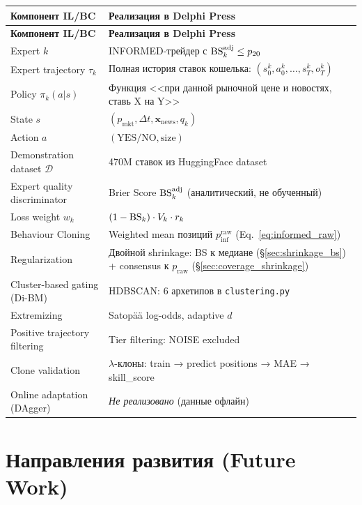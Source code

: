 \begin{longtable}{p{5.5cm}p{8cm}}
\toprule
\textbf{Компонент IL/BC} & \textbf{Реализация в Delphi Press} \\
\midrule
\endfirsthead
\midrule
\textbf{Компонент IL/BC} & \textbf{Реализация в Delphi Press} \\
\midrule
\endhead
Expert $k$ & INFORMED-трейдер с $\mathrm{BS}_k^{\mathrm{adj}} \leq p_{20}$ \\[3pt]
Expert trajectory $\tau_k$ & Полная история ставок кошелька: $(s_0^k, a_0^k, \ldots, s_T^k, o_T^k)$ \\[3pt]
Policy $\pi_k(a|s)$ & Функция <<при данной рыночной цене и новостях, ставь X на Y>> \\[3pt]
State $s$ & $(p_{\mathrm{mkt}}, \Delta t, \mathbf{x}_{\mathrm{news}}, q_k)$ \\[3pt]
Action $a$ & $(\text{YES/NO}, \text{size})$ \\[3pt]
Demonstration dataset $\mathcal{D}$ & 470M ставок из HuggingFace dataset \\[3pt]
Expert quality discriminator & Brier Score $\mathrm{BS}_k^{\mathrm{adj}}$ (аналитический, не обученный) \\[3pt]
Loss weight $w_k$ & $(1 - \mathrm{BS}_k) \cdot V_k \cdot r_k$ \\[3pt]
Behaviour Cloning & Weighted mean позиций $p_{\mathrm{inf}}^{\mathrm{raw}}$ (Eq.~\ref{eq:informed_raw}) \\[3pt]
Regularization & Двойной shrinkage: BS к медиане (\S\ref{sec:shrinkage_bs}) + consensus к $p_{\mathrm{raw}}$ (\S\ref{sec:coverage_shrinkage}) \\[3pt]
Cluster-based gating (Di-BM) & HDBSCAN: 6 архетипов в \texttt{clustering.py} \\[3pt]
Extremizing & Satop\"a\"a log-odds, adaptive $d$ \\[3pt]
Positive trajectory filtering & Tier filtering: NOISE excluded \\[3pt]
Clone validation & $\lambda$-клоны: train → predict positions → MAE → skill\_score \\[3pt]
Online adaptation (DAgger) & \emph{Не реализовано} (данные офлайн) \\
\bottomrule
\end{longtable}

\section{Направления развития (Future Work)}
\label{sec:improvements}

